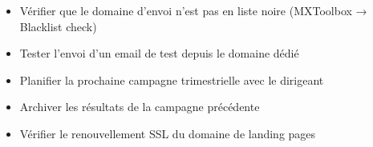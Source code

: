 \documentclass[11pt, a4paper]{article}
\begin{document}
\begin{checklist}
  \begin{itemize}
    \item[$\square$] Vérifier que le domaine d'envoi n'est pas en liste noire (MXToolbox → Blacklist check)
    \item[$\square$] Tester l'envoi d'un email de test depuis le domaine dédié
    \item[$\square$] Planifier la prochaine campagne trimestrielle avec le dirigeant
    \item[$\square$] Archiver les résultats de la campagne précédente
    \item[$\square$] Vérifier le renouvellement SSL du domaine de landing pages
  \end{itemize}
\end{checklist}
\end{document}
